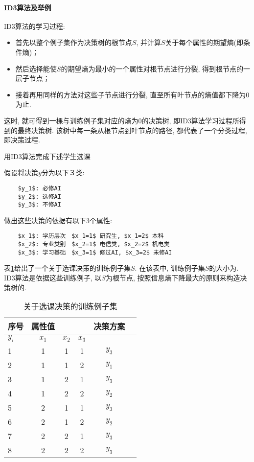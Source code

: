 \paragraph{ID3算法及举例}
ID3算法的学习过程:
\begin{itemize}
\item 首先以整个例子集作为决策树的根节点$S$, 并计算$S$关于每个属性的期望熵(即条件熵)；
\item 然后选择能使$S$的期望熵为最小的一个属性对根节点进行分裂, 得到根节点的一层子节点；
\item 接着再用同样的方法对这些子节点进行分裂, 直至所有叶节点的熵值都下降为0为止.
\end{itemize}
这时, 就可得到一棵与训练例子集对应的熵为0的决策树, 即ID3算法学习过程所得到的最终决策树. 该树中每一条从根节点到叶节点的路径, 都代表了一个分类过程, 即决策过程.

\begin{example}
用ID3算法完成下述学生选课

假设将决策$y$分为以下３类:
\begin{Verbatim}
    $y_1$: 必修AI
    $y_2$: 选修AI
    $y_3$: 不修AI
\end{Verbatim}

做出这些决策的依据有以下3个属性:
\begin{Verbatim}
    $x_1$: 学历层次　$x_1=1$ 研究生, $x_1=2$ 本科
    $x_2$: 专业类别　$x_2=1$ 电信类, $x_2=2$ 机电类
    $x_3$: 学习基础　$x_3=1$ 修过AI, $x_3=2$ 未修AI
\end{Verbatim}
\vspace{-0.4cm}
\end{example}

表\ref{AItable20122435}给出了一个关于选课决策的训练例子集$S$. 在该表中, 训练例子集$S$的大小为. ID3算法是依据这些训练例子, 以$S$为根节点, 按照信息熵下降最大的原则来构造决策树的.
\begin{table} [!tb]
\vspace{-0.2cm}
\caption{关于选课决策的训练例子集}
\vspace{-0.2cm}
\begin{center}
\begin{tabular} {lccccc}
\hline
序号&	属性值	&&&决策方案\\
\hline
$y_i$&$x_1$&$x_2$&$x_3$\\
1	&1	&1	&1&	$y_3$\\
2	&1&	1&	2&	$y_1$\\
3	&1&2&1&$y_3$\\
4&1&2&2&$y_2$\\
5&2&1&1&$y_3$\\
6&2&1&2&$y_2$\\
7&2&2&1&$y_3$\\
8&2&2&2&$y_3$\\
\hline
\end{tabular}
\end{center}
\label{AItable20122435}
\end{table}


